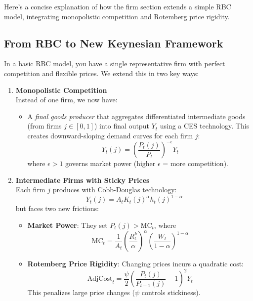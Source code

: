 \documentclass[11pt,preprint]{elsarticle}
\numberwithin{equation}{section}
\numberwithin{figure}{section}
\numberwithin{table}{section}
\def\tightlist{} %
\begin{document}
Here's a concise explanation of how the firm section extends a simple
RBC model, integrating monopolistic competition and Rotemberg price
rigidity.

\subsection{From RBC to New Keynesian
Framework}\label{from-rbc-to-new-keynesian-framework}

In a basic RBC model, you have a single representative firm with perfect
competition and flexible prices. We extend this in two key ways:

\begin{enumerate}
\def\labelenumi{\arabic{enumi}.}
\item
  \textbf{Monopolistic Competition}\\
  Instead of one firm, we now have:

  \begin{itemize}
  \tightlist
  \item
    A \emph{final goods producer} that aggregates differentiated
    intermediate goods (from firms \(j \in [0,1]\)) into final output
    \(Y_t\) using a CES technology. This creates downward-sloping demand
    curves for each firm \(j\): \[
    Y_t(j) = \left(\frac{P_t(j)}{P_t}\right)^{-\epsilon} Y_t
    \] where \(\epsilon > 1\) governs market power (higher \(\epsilon\)
    = more competition).
  \end{itemize}
\item
  \textbf{Intermediate Firms with Sticky Prices}\\
  Each firm \(j\) produces with Cobb-Douglas technology: \[
  Y_t(j) = A_t K_t(j)^\alpha h_t(j)^{1-\alpha}
  \] but faces two new frictions:

  \begin{itemize}
  \tightlist
  \item
    \textbf{Market Power}: They set \(P_t(j) > \text{MC}_t\), where \[
    \text{MC}_t = \frac{1}{A_t} \left(\frac{R_t^k}{\alpha}\right)^\alpha \left(\frac{W_t}{1-\alpha}\right)^{1-\alpha}
    \]
  \item
    \textbf{Rotemberg Price Rigidity}: Changing prices incurs a
    quadratic cost: \[
    \text{AdjCost}_t = \frac{\psi}{2} \left(\frac{P_t(j)}{P_{t-1}(j)} - 1\right)^2 Y_t
    \] This penalizes large price changes (\(\psi\) controls
    stickiness).
  \end{itemize}
\end{enumerate}
\end{document}
